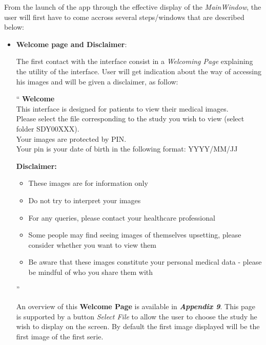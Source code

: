 From the launch of the app through the effective display of the \textit{MainWindow}, the user will first have to come accross several steps/windows that are described below:

\begin{itemize}
	\item \textbf{Welcome page and Disclaimer}:
	
	\newline \vspace{3mm} 
	
	The first contact with the interface consist in a \textit{Welcoming Page} explaining the utility of the interface. User will get indication about the way of accessing his images and will be given a disclaimer, as follow:
	
	\newline \vspace{3mm}  
	
	``
	\textbf{Welcome} \\ 
	This interface is designed for patients to view their medical images. \\
	Please select the file corresponding to the study you wish to view (select folder SDY00XXX). \\
	Your images are protected by PIN.  \\
	Your pin is your date of birth in the following format: YYYY/MM/JJ
	
	\newline \vspace{3mm}  
	
	
	\textbf{Disclaimer:}
	\begin{itemize}
		\item These images are for information only 
		\item Do not try to interpret your images 
		\item For any queries, please contact your healthcare professional 
		\item Some people may find seeing images of themselves upsetting, please consider whether you want to view them 
		\item Be aware that these images constitute your personal medical data - please be mindful of who you share them with
	\end{itemize}''
	
	
	
	\newline \vspace{3mm}  
	
	An overview of this \textbf{Welcome Page} is available in \textbf{\textit{Appendix 9}}. This page is supported by a button \textit{Select File} to allow the user to choose the study he wish to display on the screen. By default the first image displayed will be the first image of the first serie.
	 

\end{itemize}
